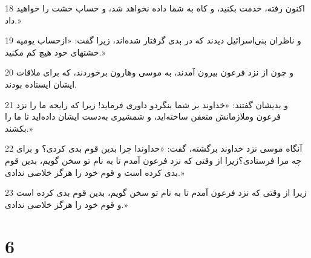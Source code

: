 \par 18 اکنون رفته، خدمت بکنید، و کاه به شما داده نخواهد شد، و حساب خشت را خواهید داد.»
\par 19 و ناظران بنی‌اسرائیل دیدند که در بدی گرفتار شده‌اند، زیرا گفت: «ازحساب یومیه خشتهای خود هیچ کم مکنید.»
\par 20 و چون از نزد فرعون بیرون آمدند، به موسی وهارون برخوردند، که برای ملاقات ایشان ایستاده بودند.
\par 21 و بدیشان گفتند: «خداوند بر شما بنگردو داوری فرماید! زیرا که رایحه ما را نزد فرعون وملازمانش متعفن ساخته‌اید، و شمشیری به‌دست ایشان داده‌اید تا ما را بکشند.»
\par 22 آنگاه موسی نزد خداوند برگشته، گفت: «خداوندا چرا بدین قوم بدی کردی؟ و برای چه مرا فرستادی؟زیرا از وقتی که نزد فرعون آمدم تا به نام تو سخن گویم، بدین قوم بدی کرده است و قوم خود را هرگز خلاصی ندادی.»
\par 23 زیرا از وقتی که نزد فرعون آمدم تا به نام تو سخن گویم، بدین قوم بدی کرده است و قوم خود را هرگز خلاصی ندادی.»
 
\chapter{6}

